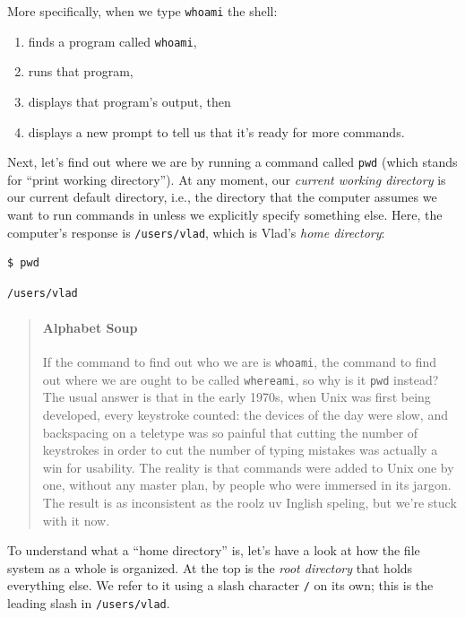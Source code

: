 \documentclass[]{book}
\newcommand{\gdef}[2]{\emph{#2}}
\begin{document}
More specifically, when we type \texttt{whoami} the shell:

\begin{enumerate}
\item
  finds a program called \texttt{whoami},
\item
  runs that program,
\item
  displays that program's output, then
\item
  displays a new prompt to tell us that it's ready for more commands.
\end{enumerate}

Next, let's find out where we are by running a command called
\texttt{pwd} (which stands for ``print working directory''). At any
moment, our \gdef{g:current-working-directory}{current working
directory} is our current default directory, i.e., the directory that
the computer assumes we want to run commands in unless we explicitly
specify something else. Here, the computer's response is
\texttt{/users/vlad}, which is Vlad's \gdef{g:home-directory}{home
directory}:

\begin{verbatim}
$ pwd
\end{verbatim}

\begin{verbatim}
/users/vlad
\end{verbatim}

\begin{quote}
\mbox{}\paragraph{Alphabet Soup}

If the command to find out who we are is \texttt{whoami}, the command to
find out where we are ought to be called \texttt{whereami}, so why is it
\texttt{pwd} instead? The usual answer is that in the early 1970s, when
Unix was first being developed, every keystroke counted: the devices of
the day were slow, and backspacing on a teletype was so painful that
cutting the number of keystrokes in order to cut the number of typing
mistakes was actually a win for usability. The reality is that commands
were added to Unix one by one, without any master plan, by people who
were immersed in its jargon. The result is as inconsistent as the roolz
uv Inglish speling, but we're stuck with it now.
\end{quote}

To understand what a ``home directory'' is, let's have a look at how the
file system as a whole is organized. At the top is the
\gdef{g:root-directory}{root directory} that holds everything else.
We refer to it using a slash character \texttt{/} on its own; this is
the leading slash in \texttt{/users/vlad}.
\end{document}
